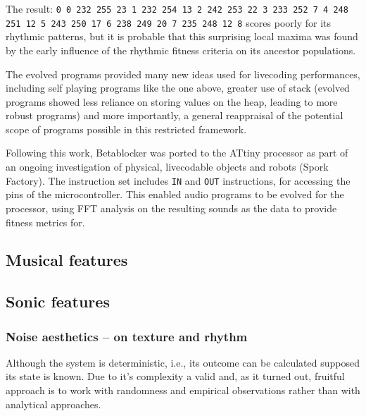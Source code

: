 \documentclass[letterpaper, 12pt]{article}
\begin{document}
The result: \texttt{0 0 232 255 23 1 232 254 13 2 242 253 22 3 233 252 7 4 248 251 12 5 243 250 17 6 238 249 20 7 235 248 12 8} scores poorly for its rhythmic patterns, but it is probable that this surprising local maxima was found by the early influence of the rhythmic fitness criteria on its ancestor populations. 

The evolved programs provided many new ideas used for livecoding performances,  including self playing programs like the one above, greater use of stack (evolved programs showed less reliance on storing values on the heap, leading to more robust programs) and more importantly, a general reappraisal of the potential scope of programs possible in this restricted framework.

Following this work, Betablocker was ported to the ATtiny processor as part of an ongoing investigation of physical, livecodable objects and robots (Spork Factory). The instruction set includes \texttt{IN} and \texttt{OUT} instructions, for accessing the pins of the microcontroller. This enabled audio programs to be evolved for the processor, using FFT analysis on the resulting sounds as the data to provide fitness metrics for. 

\subsection{Musical features} 
\label{sub:musical_features}




\subsection{Sonic features} 
\label{sub:sonic_features}


\subsubsection{Noise aesthetics -- on texture and rhythm} 
\label{sub:noise_aesthetics}

Although the system is deterministic, i.e., its outcome can be calculated supposed its state is known.
Due to it's complexity a valid and, as it turned out, fruitful approach is to work with randomness and empirical observations rather than with analytical approaches.
\end{document}
